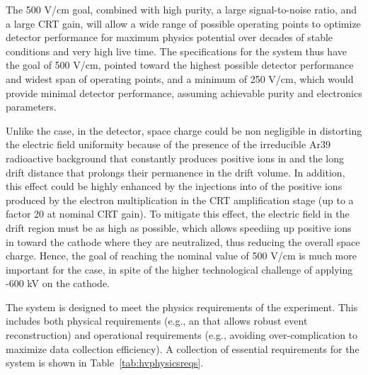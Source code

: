The 500 V/cm \efield goal, combined with high  purity, a large signal-to-noise ratio, and a large CRT gain, will allow  a wide range of possible operating points to optimize detector performance for maximum physics potential over decades of stable conditions and very high live time. 
The specifications for the    system thus have the goal of 500 V/cm, pointed  toward the highest possible detector performance and widest span of operating points, and a minimum of 250 V/cm, which would provide minimal detector performance, assuming achievable purity and electronics parameters. 

Unlike the  case, in the  detector, space charge could be non negligible in distorting the electric field uniformity because of the presence of the irreducible Ar39 radioactive background that constantly produces positive ions in  and the long drift distance that prolongs their permanence in the drift volume. In addition, this effect could be highly enhanced by the injections into  of the positive ions produced by the electron multiplication in the CRT amplification stage (up to a factor 20 at nominal CRT gain). To mitigate this effect, the electric field in the drift region must be as high as possible, which allows speediing up positive ions in  toward the cathode where they are neutralized, thus reducing the overall space charge. Hence, the goal of reaching the nominal value of 500 V/cm is much more important for the  case, in spite of the higher technological challenge of applying -600 kV on the cathode. 

The  system is designed to meet the physics requirements of the  experiment. This includes both physical requirements (e.g., an \efield 
that allows robust event reconstruction) and operational requirements (e.g., 
avoiding over-complication to maximize data collection efficiency). 
A collection of essential requirements for the  system is shown in Table~\ref{tab:hvphysicsreqs}.

